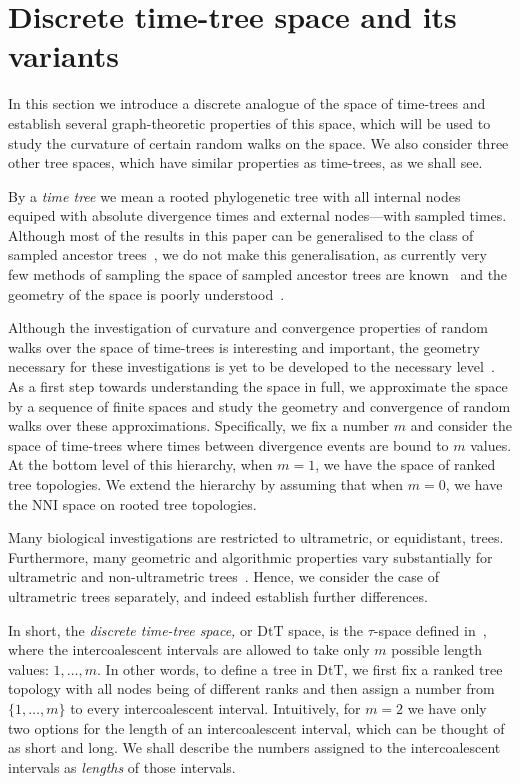 \documentclass{amsart}
\newcommand{\nni}{\mathrm{NNI}}
\newcommand{\mdts}{\mathrm{DtT}}
\begin{document}
\section{Discrete time-tree space and its variants}

In this section we introduce a discrete analogue of the space of time-trees and establish several graph-theoretic properties of this space, which will be used to study the curvature of certain random walks on the space.
We also consider three other tree spaces, which have similar properties as time-trees, as we shall see.

By a {\em time tree} we mean a rooted phylogenetic tree with all internal nodes equiped with absolute divergence times and external nodes---with sampled times.
Although most of the results in this paper can be generalised to the class of sampled ancestor trees~\cite{Gavryushkina2014-xd}, we do not make this generalisation, as currently very few methods of sampling the space of sampled ancestor trees are known~\cite{Gavryushkina2014-xd} and the geometry of the space is poorly understood~\cite{Gavryushkin2014-bw}.

Although the investigation of curvature and convergence properties of random walks over the space of time-trees is interesting and important, the geometry necessary for these investigations is yet to be developed to the necessary level~\cite{Gavryushkin2014-bw}.
As a first step towards understanding the space in full, we approximate the space by a sequence of finite spaces and study the geometry and convergence of random walks over these approximations.
Specifically, we fix a number $m$ and consider the space of time-trees where times between divergence events are bound to $m$ values.
At the bottom level of this hierarchy, when $m = 1$, we have the space of ranked tree topologies.
We extend the hierarchy by assuming that when $m = 0$, we have the $\nni$ space on rooted tree topologies.

Many biological investigations are restricted to ultrametric, or equidistant, trees.
Furthermore, many geometric and algorithmic properties vary substantially for ultrametric and non-ultrametric trees~\cite{Gavryushkin2014-bw}.
Hence, we consider the case of ultrametric trees separately, and indeed establish further differences.

In short, the {\em discrete time-tree space,} or $\mdts$ space, is the $\tau$-space defined in~\cite{Gavryushkin2014-bw}, where the intercoalescent intervals are allowed to take only $m$ possible length values: $1,\ldots,m$.
In other words, to define a tree in $\mdts$, we first fix a ranked tree topology with all nodes being of different ranks and then assign a number from $\{1, \ldots, m\}$ to every intercoalescent interval.
Intuitively, for $m = 2$ we have only two options for the length of an intercoalescent interval, which can be thought of as short and long.
We shall describe the numbers assigned to the intercoalescent intervals as {\em lengths} of those intervals.
\end{document}

